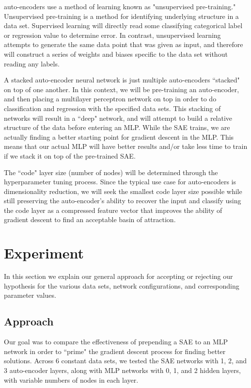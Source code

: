 \documentclass[twoside,11pt]{article}
\begin{document}
auto-encoders use a method of learning known as "unsupervised pre-training." Unsupervised pre-training is a method for identifying underlying structure in a data set. Supervised learning will directly read some classifying categorical label or regression value to determine error. In contrast, unsupervised learning attempts to generate the same data point that was given as input, and therefore will construct a series of weights and biases specific to the data set without reading any labels.

A stacked auto-encoder neural network is just multiple auto-encoders ``stacked" on top of one another. In this context, we will be pre-training an auto-encoder, and then placing a multilayer perceptron network on top in order to do classification and regression with the specified data sets. This stacking of networks will result in a ``deep" network, and will attempt to build a relative structure of the data before entering an MLP. While the SAE trains, we are actually finding a better starting point for gradient descent in the MLP. This means that our actual MLP will have better results and/or take less time to train if we stack it on top of the pre-trained SAE.

The ``code" layer size (number of nodes) will be determined through the hyperparameter tuning process. Since the typical use case for auto-encoders is dimensionality reduction, we will seek the smallest code layer size possible while still preserving the auto-encoder's ability to recover the input and classify using the code layer as a compressed feature vector that improves the ability of gradient descent to find an acceptable basin of attraction.

\section{Experiment}

In this section we explain our general approach for accepting or rejecting our hypothesis for the various data sets, network configurations, and corresponding parameter values.

     \subsection{Approach}
    
     Our goal was to compare the effectiveness of prepending a SAE to an MLP network in order to ``prime" the gradient descent process for finding better solutions. Across 6 constant data sets, we tested the SAE networks with 1, 2, and 3 auto-encoder layers, along with MLP networks with 0, 1, and 2 hidden layers, with variable numbers of nodes in each layer.
     
\end{document}
